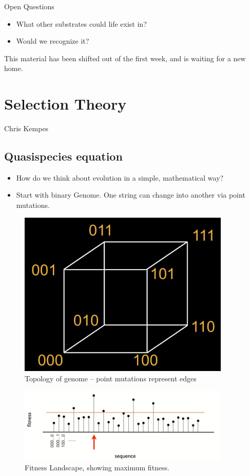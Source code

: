 \documentclass[]{article}
\begin{document}
Open Questions

\begin{itemize}
	\item What other substrates could life exist in?
	\item Would we recognize it?
\end{itemize}


\begin{appendices}
	
	This material has been shifted out of the first week, and is waiting for a new home. 
\section{Selection Theory}
Chris Kempes

\subsection{Quasispecies equation}
\begin{itemize}
	\item How do we think about evolution in a simple, mathematical way?
	\item Start with binary Genome. One string can change into another via point mutations.
\end{itemize}


\begin{figure}[H]
	\caption{Topology of genome -- point mutations represent edges}\label{fig:GenomeTopology} 
	\includegraphics[width=0.9\textwidth]{GenomeTopology}
\end{figure}

\begin{figure}[H]
	\caption{Fitness Landscape, showing maximum fitness.}\label{fig:FitnessLandscape} 
	\includegraphics[width=0.9\textwidth]{FitnessLandscape}
\end{figure}


\end{appendices}
\end{document}
